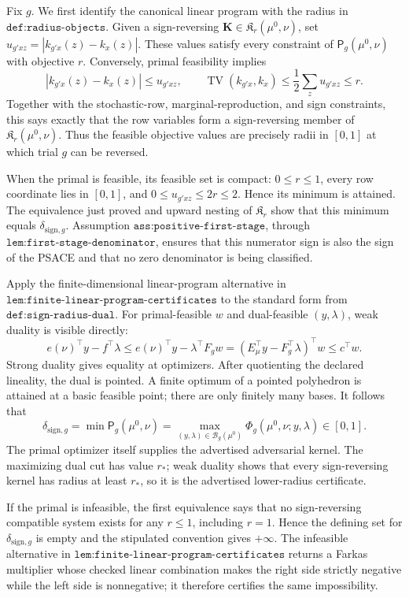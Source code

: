 Fix \(g\).  We first identify the canonical linear program with the radius in \(\texttt{def:radius-objects}\).  Given a sign-reversing \(\mathbf K\in\mathfrak K_r(\mu^0,\nu)\), set
\(u_{g'xz}=|k_{g'x}(z)-k_x(z)|\).  These values satisfy every constraint of \(\mathsf P_g(\mu^0,\nu)\) with objective \(r\).  Conversely, primal feasibility implies
\[
 |k_{g'x}(z)-k_x(z)|\le u_{g'xz},
 \qquad
 \operatorname{TV}(k_{g'x},k_x)
 \le\frac12\sum_z u_{g'xz}\le r.
\]
Together with the stochastic-row, marginal-reproduction, and sign constraints, this says exactly that the row variables form a sign-reversing member of \(\mathfrak K_r(\mu^0,\nu)\).  Thus the feasible objective values are precisely radii in \([0,1]\) at which trial \(g\) can be reversed.

When the primal is feasible, its feasible set is compact: \(0\le r\le1\), every row coordinate lies in \([0,1]\), and \(0\le u_{g'xz}\le2r\le2\).  Hence its minimum is attained.  The equivalence just proved and upward nesting of \(\mathfrak K_r\) show that this minimum equals \(\delta_{\mathrm{sign},g}\).  Assumption \(\texttt{ass:positive-first-stage}\), through \(\texttt{lem:first-stage-denominator}\), ensures that this numerator sign is also the sign of the PSACE and that no zero denominator is being classified.

Apply the finite-dimensional linear-program alternative in \(\texttt{lem:finite-linear-program-certificates}\) to the standard form from \(\texttt{def:sign-radius-dual}\).  For primal-feasible \(w\) and dual-feasible \((y,\lambda)\), weak duality is visible directly:
\[
 e(\nu)^{\top}y-f^{\top}\lambda
 \le e(\nu)^{\top}y-\lambda^{\top}F_gw
 =(E_\mu^{\top}y-F_g^{\top}\lambda)^{\top}w
 \le c^{\top}w.
\]
Strong duality gives equality at optimizers.  After quotienting the declared lineality, the dual is pointed.  A finite optimum of a pointed polyhedron is attained at a basic feasible point; there are only finitely many bases.  It follows that
\[
 \delta_{\mathrm{sign},g}
 =\min\mathsf P_g(\mu^0,\nu)
 =\max_{(y,\lambda)\in\mathcal B_g(\mu^0)}
   \Phi_g(\mu^0,\nu;y,\lambda)\in[0,1].
\]
The primal optimizer itself supplies the advertised adversarial kernel.  The maximizing dual cut has value \(r_*\); weak duality shows that every sign-reversing kernel has radius at least \(r_*\), so it is the advertised lower-radius certificate.

If the primal is infeasible, the first equivalence says that no sign-reversing compatible system exists for any \(r\le1\), including \(r=1\).  Hence the defining set for \(\delta_{\mathrm{sign},g}\) is empty and the stipulated convention gives \(+\infty\).  The infeasible alternative in \(\texttt{lem:finite-linear-program-certificates}\) returns a Farkas multiplier whose checked linear combination makes the right side strictly negative while the left side is nonnegative; it therefore certifies the same impossibility.

